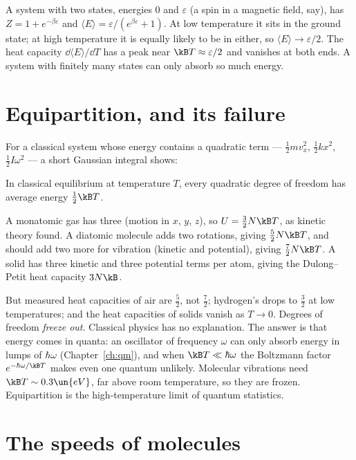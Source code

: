 \begin{example}
A system with two states, energies $0$ and $\varepsilon$ (a spin in a magnetic field, say), has $Z = 1 + e^{-\beta\varepsilon}$ and $\langle E\rangle = \varepsilon/(e^{\beta\varepsilon}+1)$. At low temperature it sits in the ground state; at high temperature it is equally likely to be in either, so $\langle E\rangle\to\varepsilon/2$. The heat capacity $\dd\langle E\rangle/\dd T$ has a peak near $\kB T\approx\varepsilon/2$ and vanishes at both ends. A system with finitely many states can only absorb so much energy.
\end{example}

\section{Equipartition, and its failure}

For a classical system whose energy contains a quadratic term --- $\tfrac12mv_x^2$, $\tfrac12 kx^2$, $\tfrac12I\omega^2$ --- a short Gaussian integral shows:

\begin{theorem}[Equipartition]
In classical equilibrium at temperature $T$, every quadratic degree of freedom has average energy $\tfrac12\kB T$.
\end{theorem}

A monatomic gas has three (motion in $x$, $y$, $z$), so $U = \tfrac32N\kB T$, as kinetic theory found. A diatomic molecule adds two rotations, giving $\tfrac52N\kB T$, and should add two more for vibration (kinetic and potential), giving $\tfrac72N\kB T$. A solid has three kinetic and three potential terms per atom, giving the Dulong--Petit heat capacity $3N\kB$.

But measured heat capacities of air are $\tfrac52$, not $\tfrac72$; hydrogen's drops to $\tfrac32$ at low temperatures; and the heat capacities of solids vanish as $T\to0$. Degrees of freedom \emph{freeze out}. Classical physics has no explanation. The answer is that energy comes in quanta: an oscillator of frequency $\omega$ can only absorb energy in lumps of $\hbar\omega$ (Chapter~\ref{ch:qm}), and when $\kB T\ll\hbar\omega$ the Boltzmann factor $e^{-\hbar\omega/\kB T}$ makes even one quantum unlikely. Molecular vibrations need $\kB T\sim0.3\un{eV}$, far above room temperature, so they are frozen. Equipartition is the high-temperature limit of quantum statistics.

\section{The speeds of molecules}

